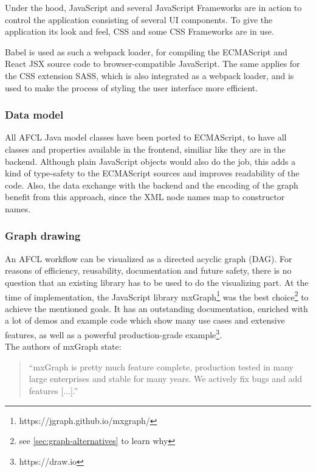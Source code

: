 \documentclass[a4paper,12pt,pdftex,halfparskip,cleardoubleempty,bibtotoc,liststotoc]{scrbook}
\begin{document}
Under the hood, JavaScript and several JavaScript Frameworks are in action to control the application consisting of several UI components. To give the application its look and feel, CSS and some CSS Frameworks are in use.

Babel is used as such a webpack loader, for compiling the ECMAScript and React JSX source code to browser-compatible JavaScript.
The same applies for the CSS extension SASS, which is also integrated as a webpack loader, and is used to make the process of styling the user interface more efficient.


\subsubsection{Data model}

All AFCL Java model classes\cite{online-afcl-docs-dps} have been ported to ECMAScript, to have all classes and properties available in the frontend, similiar like they are in the backend. Although plain JavaScript objects would also do the job, this adds a kind of type-safety to the ECMAScript sources and improves readability of the code. Also, the data exchange with the backend and the encoding of the graph benefit from this approach, since the XML node names map to constructor names.

\subsubsection{Graph drawing}

An AFCL workflow can be visualized as a directed acyclic graph (DAG). For reasons of efficiency, reusability, documentation and future safety, there is no question that an existing library has to be used to do the visualizing part.
At the time of implementation, the JavaScript library mxGraph\footnote{https://jgraph.github.io/mxgraph/} was the best choice\footnote{see \ref{sec:graph-alternatives} to learn why} to achieve the mentioned goals.
It has an outstanding documentation, enriched with a lot of demos and example code which show many use cases and extensive features, as well as a powerful production-grade example\footnote{https://draw.io}.\\
The authors of mxGraph state:\\
\begin{quote}
``mxGraph is pretty much feature complete, production tested in many large enterprises and stable for many years. We actively fix bugs and add features [...].''
\end{quote}
\end{document}
